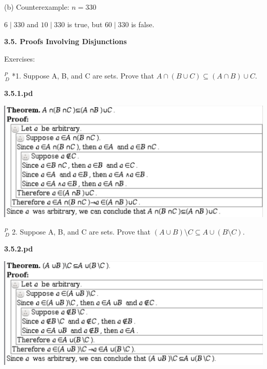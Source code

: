\documentclass{article}
\begin{document}
(b) Counterexample: $n = 330$

$6 \mid 330$ and $10 \mid 330$ is true, but $60 \mid 330$ is false.


\vspace{50pt}

\textbf{3.5. Proofs Involving Disjunctions}

Exercises:
\vspace{30pt}

$^{\textit{P}}_{\, \textit{D}}$ *1. Suppose A, B, and C are sets. Prove that $A \cap (B \cup C) \subseteq (A \cap B) \cup C$.
\vspace{30pt}

\textbf{3.5.1.pd}
\vspace{10pt}

\includegraphics[width=\textwidth]{3_5_1}

\vspace{30pt}

$^{\textit{P}}_{\, \textit{D}}$ 2. Suppose A, B, and C are sets. Prove that $(A \cup B) \setminus C \subseteq A \cup (B \setminus C)$.

\vspace{30pt}

\textbf{3.5.2.pd}
\vspace{10pt}

\includegraphics[width=\textwidth]{3_5_2}

\vspace{30pt}
\end{document}
